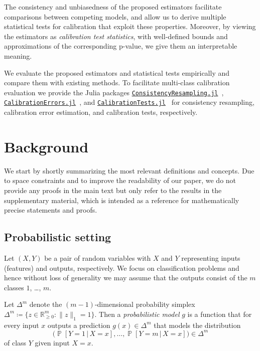 \documentclass{article}
\DeclareMathOperator{\Prob}{\mathbb{P}}
\newcommand{\given}{\,|\,}
\begin{document}
The consistency and unbiasedness of the proposed estimators facilitate
comparisons between competing models, and allow us to derive multiple
statistical tests for calibration that exploit these properties. Moreover, by
viewing the estimators as \emph{calibration test statistics}, with well-defined
bounds and approximations of the corresponding p-value, we give them an
interpretable meaning.

We evaluate the proposed estimators and statistical tests empirically and
compare them with existing methods. To facilitate multi-class calibration
evaluation we provide the Julia packages \href{https://github.com/devmotion/ConsistencyResampling.jl}{\texttt{ConsistencyResampling.jl}}~\citep{widmann19_consis_resampling},
\href{https://github.com/devmotion/CalibrationErrors.jl}{\texttt{CalibrationErrors.jl}}~\citep{widmann19_calib_errors}, and
\href{https://github.com/devmotion/CalibrationTests.jl}{\texttt{CalibrationTests.jl}}~\citep{widmann19_calib_tests}
for consistency resampling, calibration error estimation, and calibration tests,
respectively.

\section{Background}

We start by shortly summarizing the most relevant definitions and concepts. Due
to space constraints and to improve the readability of our paper, we do not
provide any proofs in the main text but only refer to the results in the
supplementary material, which is intended as a reference for mathematically
precise statements and proofs.

\subsection{Probabilistic setting}

Let $(X,Y)$ be a pair of random variables with $X$ and $Y$ representing inputs
(features) and outputs, respectively. We focus on classification problems and
hence without loss of generality we may assume that the outputs consist of the
$m$ classes $1$, \ldots, $m$.

Let $\Delta^m$ denote the $(m-1)$-dimensional probability simplex
$\Delta^m \coloneqq \{ z \in \mathbb{R}_{\geq 0}^m \colon \|z\|_1 = 1\}$. Then
a \emph{probabilistic model} $g$ is a function that for every input $x$ outputs
a prediction $g(x) \in \Delta^m$ that models the distribution
\begin{equation*}
  \big(\Prob[Y = 1 \given X = x], \ldots, \Prob[Y=m \given X = x]\big) \in \Delta^m
\end{equation*}
of class $Y$ given input $X = x$.
\end{document}
